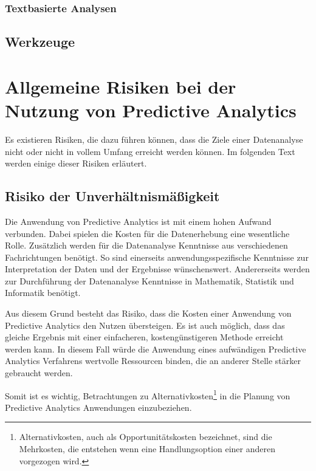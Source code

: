 \subsubsection{Textbasierte Analysen}

\subsection{Werkzeuge}


\section{Allgemeine Risiken bei der Nutzung von Predictive Analytics}

Es existieren Risiken, die dazu führen können, dass die Ziele einer
Datenanalyse nicht oder nicht in vollem Umfang erreicht werden können.
Im folgenden Text werden einige dieser Risiken erläutert.

\subsection{Risiko der Unverhältnismäßigkeit}

Die Anwendung von Predictive Analytics ist mit einem hohen Aufwand verbunden.
Dabei spielen die Kosten für die Datenerhebung eine wesentliche Rolle.
Zusätzlich werden für die Datenanalyse Kenntnisse aus verschiedenen
Fachrichtungen benötigt. So sind einerseits anwendungsspezifische Kenntnisse
zur Interpretation der Daten und der Ergebnisse wünschenswert. Andererseits
werden zur Durchführung der Datenanalyse Kenntnisse in Mathematik, Statistik und
Informatik benötigt.

Aus diesem Grund besteht das Risiko, dass die Kosten einer Anwendung von
Predictive Analytics den Nutzen übersteigen. Es ist auch möglich, dass das
gleiche Ergebnis mit einer einfacheren, kostengünstigeren Methode erreicht
werden kann. In diesem Fall würde die Anwendung eines aufwändigen Predictive
Analytics Verfahrens wertvolle Ressourcen binden, die an anderer Stelle stärker
gebraucht werden. 

Somit ist es wichtig, Betrachtungen zu Alternativkosten\footnote{
Alternativkosten, auch als Opportunitätskosten bezeichnet, sind die Mehrkosten,
die entstehen wenn eine Handlungsoption einer anderen vorgezogen
wird. %
}
in die Planung von Predictive Analytics Anwendungen einzubeziehen. 

